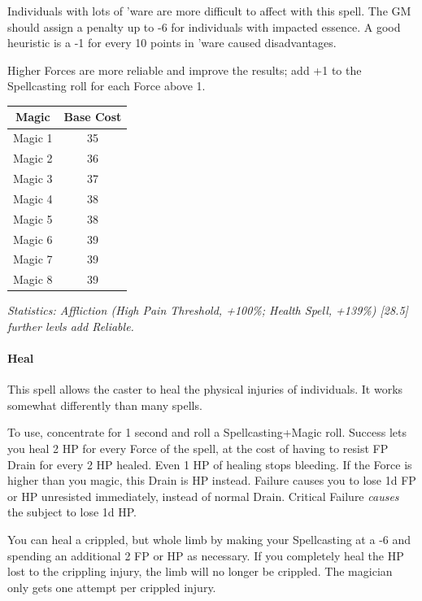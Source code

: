 \begin{multicols*}{3}
	Individuals with lots of 'ware are more difficult to affect with this spell. The GM should assign a penalty up to -6 for individuals with impacted essence. A good heuristic is a -1 for every 10 points in 'ware caused disadvantages.
	
	Higher Forces are more reliable and improve the results; add +1 to the Spellcasting roll for each Force above 1.
	
	\begin{center}
		\begin{tabular}{|c|c|}
			\hline
			Magic & Base Cost \\
			\hline
			\hline
			Magic 1 & 35 \\
			Magic 2 & 36 \\
			Magic 3 & 37  \\
			Magic 4 & 38 \\
			Magic 5 & 38 \\
			Magic 6 & 39 \\
			Magic 7 & 39 \\
			Magic 8 & 39 \\
			\hline
		\end{tabular}
	\end{center}
		
	\textcolor{OliveGreen}{\textit{Statistics: Affliction (High Pain Threshold, +100\%; Health Spell, +139\%) [28.5] further levls add Reliable. }}
	
	\paragraph{Heal}
	
	This spell allows the caster to heal the physical injuries of individuals. It works somewhat differently than many spells.
	
	To use, concentrate for 1 second and roll a Spellcasting+Magic roll. Success lets you heal 2 HP for every Force of the spell, at the cost of having to resist FP Drain for every 2 HP healed. Even 1 HP of healing stops bleeding. If the Force is higher than you magic, this Drain is HP instead. Failure causes you to lose 1d FP or HP unresisted immediately, instead of normal Drain. Critical Failure \textit{causes} the subject to lose 1d HP.
	
	You can heal a crippled, but whole limb by making your Spellcasting at a -6 and spending an additional 2 FP or HP as necessary. If you completely heal the HP lost to the crippling injury, the limb will no longer be crippled. The magician only gets one attempt per crippled injury.
	

\end{multicols*}
